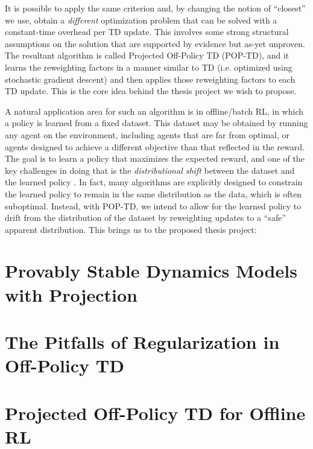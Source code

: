 \documentclass[11pt]{book}
\begin{document}
It is possible to apply the same criterion and, by changing the notion of ``closest'' we use, obtain a \emph{different} optimization problem that can be solved with a constant-time overhead per TD update. This involves some strong structural assumptions on the solution that are supported by evidence but as-yet unproven. The resultant algorithm is called Projected Off-Policy TD (POP-TD), and it learns the reweighting factors in a manner similar to TD (i.e. optimized using stochastic gradient descent) and then applies those reweighting factors to each TD update. This is the core idea behind the thesis project we wish to propose.

A natural application area for such an algorithm is in offline/batch RL, in which a policy is learned from a fixed dataset. This dataset may be obtained by running any agent on the environment, including agents that are far from optimal, or agents designed to achieve a different objective than that reflected in the reward. The goal is to learn a policy that maximizes the expected reward, and one of the key challenges in doing that is the \emph{distributional shift} between the dataset and the learned policy \cite{levine2020survey}. In fact, many algorithms are explicitly designed to constrain the learned policy to remain in the same distribution as the data, which is often suboptimal. Instead, with POP-TD, we intend to allow for the learned policy to drift from the distribution of the dataset by reweighting updates to a ``safe'' apparent distribution. This brings us to the proposed thesis project:


\mainmatter
\chapter{Provably Stable Dynamics Models with Projection}




\chapter{The Pitfalls of Regularization in Off-Policy TD}

\chapter{Projected Off-Policy TD for Offline RL}


\end{document}
